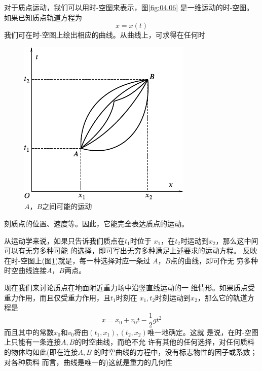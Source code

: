 对于质点运动，我们可以用时-空图来表示，图\ref{fig:04.06}
是一维运动的时-空图。如果已知质点轨道方程为
\begin{equation*}
  x = x \left( t \right)
\end{equation*}
我们可在时-空图上绘出相应的曲线。从曲线上，可求得在任何时
\begin{figure}
  \vspace{-1em}
  \centering
  \includegraphics{figure/fig04.07}
  \caption{$ A $，$ B $之间可能的运动}
  \label{fig:04.07}
\end{figure}
刻质点的位置、速度等。因此，它能完全表达质点的运动。

从运动学来说，如果只告诉我们质点在$ t_1 $时位于
$ x_1 $，在$ t_2 $时运动到$ x_2 $，那么这中间可以有无穷多种可能
的选择，即可写出无穷多种满足上述要求的运动方程。
反映在时-空图上(图\ref{fig:04.07})就是，每一种选择对应一条过
$ A $，$ B $点的曲线，即可作无
穷多种时空曲线连接$ A $，$ B $两点。

现在我们来讨论质点在地面附近重力场中沿竖直线运动的一
维情形。如果质点受重力作用，而且仅受重力作用，且$ t _ { 1 } $时刻在
$ x _ { 1 } , t _ { 2 } $时刻运动到$ x _ { 2 } $，那么它的轨道方程是
\begin{equation*}
  x = x _ { 0 } + v _ { 0 } t - \frac { 1 } { 2 } g t ^ { 2 }
\end{equation*}
而且其中的常数$ x _ { 0 } $和$ v _ { 0 } $将由$ \left( t _ { 1 }, x _ { 1 } \right) , \left( t _ { 2 } , x _ { 2 } \right) $唯一地确定。这就
是说，在时-空图上只能有一条连接$ A , B $的时空曲线，而绝不允
许有其他的任何选择，对任何质料的物体均如此(即在连接$ A , B $
的时空曲线的方程中，没有标志物性的因子或系数；对各种质料
而言，曲线是唯一的)这就是重力的几何性

